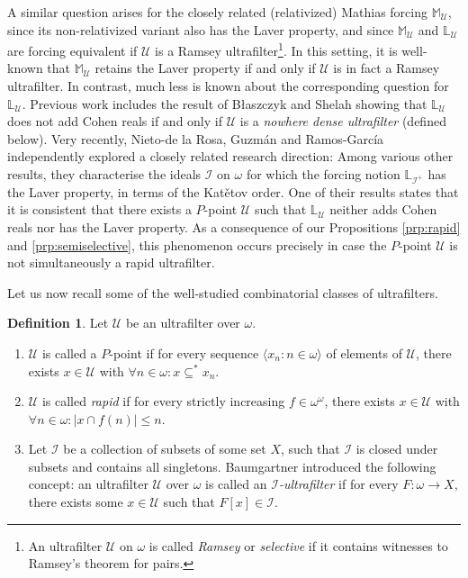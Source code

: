 \documentclass[12pt]{article}
\theoremstyle{definition}
\newtheorem{defi}[nummer]{\sc Definition}
\begin{document}
A similar question arises for the closely related (relativized) Mathias forcing $\mathbb{M}_{\mathcal{U}}$, since its non-relativized variant also has the Laver property, and since $\mathbb{M}_{\mathcal{U}}$ and $\mathbb{L}_{\mathcal{U}}$ are forcing equivalent if $\mathcal{U}$ is a Ramsey ultrafilter\footnote{An ultrafilter $\mathcal{U}$ on $\omega$ is called \emph{Ramsey} or \emph{selective} if it contains witnesses to Ramsey's theorem for pairs.}. In this setting, it is well-known that $\mathbb{M}_{\mathcal{U}}$ retains the Laver property if and only if $\mathcal{U}$ is in fact a Ramsey ultrafilter. In contrast, much less is known about the corresponding question for $\mathbb{L}_{\mathcal{U}}$. Previous work includes the result of B{\l}aszczyk and Shelah \cite{blaszczyk2001regular} showing that $\mathbb{L}_{\mathcal{U}}$ does not add Cohen reals if and only if $\mathcal{U}$ is a \emph{nowhere dense ultrafilter} (defined below). Very recently, Nieto-de la Rosa, Guzm\'an and Ramos-Garc\'ia \cite{nietoguzmanramos26} independently explored a closely related research direction: Among various other results, they characterise the ideals $\mathcal{I}$ on $\omega$ for which the forcing notion $\mathbb{L}_{\mathcal{I}^{+}}$ has the Laver property, in terms of the Kat\v{e}tov order.   One of their results states that it is consistent that there exists a $P$-point $\mathcal{U}$ such that $\mathbb{L}_{\mathcal{U}}$ neither adds Cohen reals nor has the Laver property. As a consequence of our Propositions \ref{prp:rapid} and \ref{prp:semiselective}, this phenomenon occurs precisely in case the $P$-point $\mathcal{U}$ is not simultaneously a rapid ultrafilter.

Let us now recall some of the well-studied combinatorial classes of ultrafilters.

\begin{defi}
Let $\mathcal{U}$ be an ultrafilter over $\omega$.
\begin{enumerate}[label=(\roman*)]
\item $\mathcal{U}$ is called a $P$-point if for every sequence $\langle x_n: n \in \omega\rangle$ of elements of $\mathcal{U}$, there exists $x\in \mathcal{U}$ with $\forall n \in \omega: x \subseteq^{\ast}x_n$.
\item $\mathcal{U}$ is called \emph{rapid} if for every strictly increasing $f\in \omega^\omega$, there exists $x\in \mathcal{U}$ with $\forall n \in \omega: |x \cap f(n)|\leq n$.
\item Let $\mathcal{I}$ be a collection of subsets of some set $X$, such that $\mathcal{I}$ is closed under subsets and contains all singletons. Baumgartner \cite{baumgartner-uf} introduced the following concept: an ultrafilter $\mathcal{U}$ over $\omega$ is called an \textit{$\mathcal{I}$-ultrafilter} if for every $F: \omega \to X$, there exists some $x\in \mathcal{U}$ such that $F[x]\in \mathcal{I}$.
\end{enumerate}
\end{defi}
\end{document}
